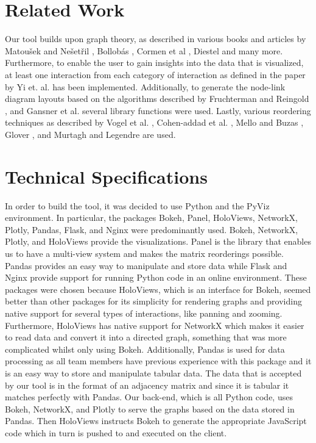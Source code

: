 \documentclass[journal]{vgtc}                %
\begin{document}
\section{Related Work} %
Our tool builds upon graph theory, as described in various books and articles by Matou\v{s}ek and Ne\v{s}et\v{r}il \cite{Matousek:2009}, Bollob\'{a}s \cite{Bollobas:1998}, Cormen et al \cite{Cormen:2009}, Diestel \cite{Diestel:2017} and many more. Furthermore, to enable the user to gain insights into the data that is visualized, at least one interaction from each category of interaction as defined in the paper by Yi et. al. \cite{Yi:2007} has been implemented. Additionally, to generate the node-link diagram layouts based on the algorithms described by Fruchterman and Reingold \cite{Fruchterman:1991}, and Gansner et al. \cite{Gansner:1993} several library functions were used. Lastly, various reordering techniques as described by Vogel et al. \cite{Vogel:1986}, Cohen-addad et al. \cite{Cohen-addad:2019:HCO:3338848.3321386}, Mello and Buzas \cite{mello1968application}, Glover \cite{DBLP:journals/corr/Glover16}, and Murtagh and Legendre \cite{DBLP:journals/corr/abs-1111-6285} are used.

\section{Technical Specifications} \label{sec:tech_spec}%
In order to build the tool, it was decided to use Python and the PyViz environment. In particular, the packages Bokeh, Panel, HoloViews, NetworkX, Plotly, Pandas, Flask, and Nginx were predominantly used. Bokeh, NetworkX, Plotly, and HoloViews provide the visualizations. Panel is the library that enables us to have a multi-view system and makes the matrix reorderings possible. Pandas provides an easy way to manipulate and store data while Flask and Nginx provide support for running Python code in an online environment. These packages were chosen because HoloViews, which is an interface for Bokeh, seemed better than other packages for its simplicity for rendering graphs and providing native support for several types of interactions, like panning and zooming. Furthermore, HoloViews has native support for NetworkX which makes it easier to read data and convert it into a directed graph, something that was more complicated whilst only using Bokeh. Additionally, Pandas is used for data processing as all team members have previous experience with this package and it is an easy way to store and manipulate tabular data. The data that is accepted by our tool is in the format of an adjacency matrix and since it is tabular it matches perfectly with Pandas. Our back-end, which is all Python code, uses Bokeh, NetworkX, and Plotly to serve the graphs based on the data stored in Pandas. Then HoloViews instructs Bokeh to generate the appropriate JavaScript code which in turn is pushed to and executed on the client.
\end{document}
